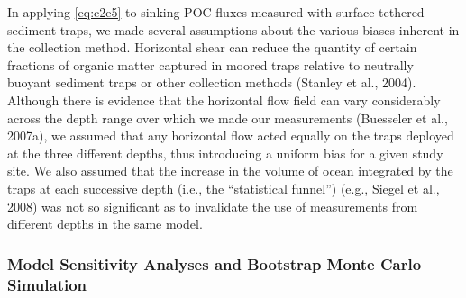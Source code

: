 In applying \autoref{eq:c2e5} to sinking POC fluxes measured with surface-tethered sediment traps, we made several assumptions about the various biases inherent in the collection method. Horizontal shear can reduce the quantity of certain fractions of organic matter captured in moored traps relative to neutrally buoyant sediment traps or other collection methods (Stanley et al., 2004). Although there is evidence that the horizontal flow field can vary considerably across the depth range over which we made our measurements (Buesseler et al., 2007a), we assumed that any horizontal flow acted equally on the traps deployed at the three different depths, thus introducing a uniform bias for a given study site. We also assumed that the increase in the volume of ocean integrated by the traps at each successive depth (i.e., the ``statistical funnel'') (e.g., Siegel et al., 2008) was not so significant as to invalidate the use of measurements from different depths in the same model.

\subsubsection{Model Sensitivity Analyses and Bootstrap Monte Carlo Simulation}

